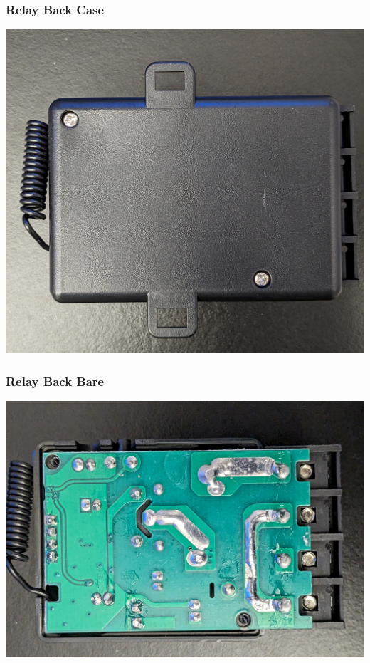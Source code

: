 \documentclass{beamer}
\begin{document}
\begin{frame}
\frametitle{Relay Back Case}
  \includegraphics[width=\textwidth]{../Pics/device/relay_back_case.jpg}
\end{frame}

\begin{frame}
\frametitle{Relay Back Bare}
  \includegraphics[width=\textwidth]{../Pics/device/relay_back_bare.jpg}
\end{frame}
\end{document}
